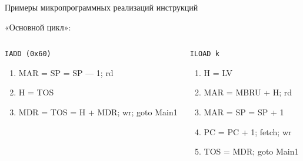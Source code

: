 \begin{frame}{Примеры микропрограммных реализаций инструкций}
    \ttfamily\small

\pause
«Основной цикл»:\\

\begin{columns}
        \column{5.5cm}

    \pause
    \begin{block}{\texttt{IADD (0x60)}}
    \pause
    \begin{enumerate}
        \item MAR = SP = SP — 1; rd
        \item H = TOS
        \item MDR = TOS = H + MDR; wr; goto Main1
    \end{enumerate}
    \end{block}

        \column{5.5cm}
    \pause
    \begin{block}{\texttt{ILOAD k}}
    \begin{enumerate}
        \item H = LV
        \item MAR = MBRU + H; rd
        \item MAR = SP = SP + 1
        \item PC = PC + 1; fetch; wr
        \item TOS = MDR; goto Main1
    \end{enumerate}
    \end{block}

\end{columns}
\end{frame}







